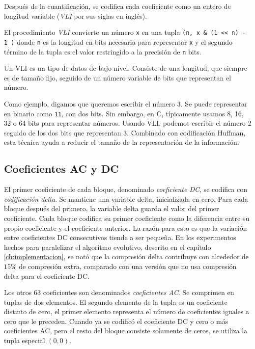 Después de la cuantificación, se codifica cada coeficiente como un entero de
longitud variable (\emph{\gls{VLI}} por sus siglas en inglés).

El procedimiento \emph{VLI} convierte un número \verb+x+ en una tupla \verb+(n, x & (1 << n) - 1 )+
donde \verb+n+ es la longitud en bits necesaria para
representar \verb+x+ y el segundo término de la tupla es el valor restringido a
la precisión de \verb+n+ bits.

Un VLI es un tipo de datos de bajo nivel. Consiste de una longitud, que siempre
es de tamaño fijo, seguido de un número variable de bits que representan el
número.

Como ejemplo, digamos que queremos escribir el número 3. Se puede representar
en binario como \verb+11+, con dos bits. Sin embargo, en C, típicamente usamos
8, 16, 32 o 64 bits para representar números. Usando VLI, podemos escribir el
número 2 seguido de los dos bits que representan 3. Combinado con codificación
Huffman, esta técnica ayuda a reducir el tamaño de la representación de la
información.

\subsection{Coeficientes AC y DC}\label{sub:acdc}

El primer coeficiente de cada bloque, denominado \emph{\gls{coeficiente DC}},
se codifica con \emph{\gls{codificación delta}}. Se mantiene una variable
delta, inicializada en cero. Para cada bloque después del primero, la variable
delta guarda el valor del primer coeficiente. Cada bloque codifica su primer
coeficiente como la diferencia entre su propio coeficiente y el coeficiente
anterior. La razón para esto es que la variación entre coeficientes DC
consecutivos tiende a ser pequeña. En los experimentos hechos para paralelizar
el algoritmo evolutivo, descrito en el capítulo \ref{ch:implementacion}, se
notó que la compresión delta contribuye con alrededor de $15\%$ de compresión
extra, comparado con una versión que no usa compresión delta para el
coeficiente DC.

Los otros 63 coeficientes son denominados \emph{\gls{coeficientes AC}}. Se
comprimen en tuplas de dos elementos. El segundo elemento de la tupla es un
coeficiente distinto de cero, el primer elemento representa el número
de coeficientes iguales a cero que le preceden. Cuando ya se codificó el
coeficiente DC y cero o más coeficientes AC, pero el resto del bloque consiste
solamente de ceros, se utiliza la tupla especial $(0,0)$.

